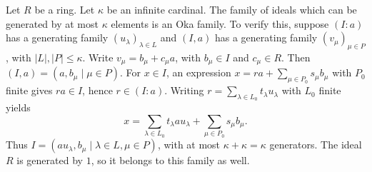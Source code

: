 \begin{example}
\label{editorial-source-example-oka-family-bound-cardinality}
Let $R$ be a ring.
Let $\kappa$ be an infinite cardinal.
The family of ideals which can be generated by at most $\kappa$ elements
is an Oka family. To verify this, suppose $(I:a)$ has a
generating family $(u_\lambda)_{\lambda\in L}$ and $(I,a)$ has
a generating family $(v_\mu)_{\mu\in P}$, with $|L|,|P|\leq\kappa$.
Write $v_\mu=b_\mu+c_\mu a$, with $b_\mu\in I$ and $c_\mu\in R$.
Then $(I,a)=(a,b_\mu\mid\mu\in P)$.
For $x\in I$, an expression
$x=ra+\sum_{\mu\in P_0}s_\mu b_\mu$ with $P_0$ finite gives
$ra\in I$, hence $r\in(I:a)$. Writing
$r=\sum_{\lambda\in L_0}t_\lambda u_\lambda$ with $L_0$ finite yields
$$
x=\sum_{\lambda\in L_0}t_\lambda a u_\lambda+
\sum_{\mu\in P_0}s_\mu b_\mu.
$$
Thus $I=(a u_\lambda,b_\mu\mid\lambda\in L,\mu\in P)$, with
at most $\kappa+\kappa=\kappa$ generators. The ideal $R$ is
generated by $1$, so it belongs to this family as well.
\end{example}